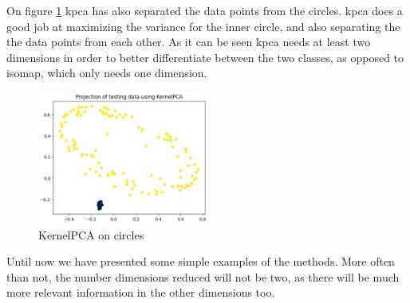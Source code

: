 On figure \ref{fig:circles-kernelpca} \gls{kpca} has also separated the data points from the circles. \gls{kpca} does a good job at maximizing the variance for the inner circle, and also separating the the data points from each other. As it can be seen \gls{kpca} needs at least two dimensions in order to better differentiate between the two classes, as opposed to \gls{isomap}, which only needs one dimension.
\begin{figure}[h]
    \centering
    \includegraphics[width=0.5\textwidth]{figures/theory-example-figures/circles-kernelpca.png}
    \caption{KernelPCA on circles}
    \label{fig:circles-kernelpca}
\end{figure}


Until now we have presented some simple examples of the methods. More often than not, the number dimensions reduced will not be two, as there will be much more relevant information in the other dimensions too.

